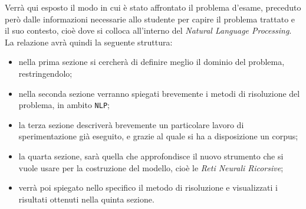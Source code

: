 \documentclass[twoside,twocolumn,10pt]{extarticle}
\theoremstyle{definition}
\begin{document}
	Verrà qui esposto il modo in cui è stato affrontato il problema d'esame, preceduto però dalle informazioni necessarie allo studente per capire il problema trattato e il suo contesto, cioè dove si colloca all'interno del \textit{Natural Language Processing}. La relazione avrà quindi la seguente struttura:
	\begin{itemize}
		\item nella prima sezione si cercherà di definire meglio il dominio del problema, restringendolo;
		\item nella seconda sezione verranno spiegati brevemente i metodi di risoluzione del problema, in ambito \texttt{NLP};
		\item la terza sezione descriverà brevemente un particolare lavoro di sperimentazione già eseguito, e grazie al quale si ha a disposizione un corpus;
		\item la quarta sezione, sarà quella che approfondisce il nuovo strumento che si vuole usare per la costruzione del modello, cioè le \textit{Reti Neurali Ricorsive};
		\item verrà poi spiegato nello specifico il metodo di risoluzione e visualizzati i risultati ottenuti nella quinta sezione.
	\end{itemize}
	
\end{document}
